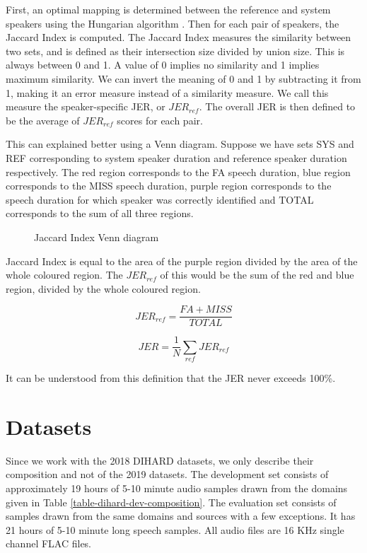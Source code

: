 	First, an optimal mapping is determined between the reference and system speakers using the Hungarian algorithm \cite{hungarian}. Then for each pair of speakers, the Jaccard Index \cite{hamers1989similarity} is computed. The Jaccard Index measures the similarity between two sets, and is defined as their intersection size divided by union size. This is always between 0 and 1. A value of 0 implies no similarity and 1 implies maximum similarity. We can invert the meaning of 0 and 1 by subtracting it from 1, making it an error measure instead of a similarity measure. We call this measure the speaker-specific JER, or $JER_{ref}$. The overall JER is then defined to be the average of $JER_{ref}$ scores for each pair.
	
	This can explained better using a Venn diagram. Suppose we have sets SYS and REF corresponding to system speaker duration and reference speaker duration respectively. The red region corresponds to the FA speech duration, blue region corresponds to the MISS speech duration, purple region corresponds to the speech duration for which speaker was correctly identified and TOTAL corresponds to the sum of all three regions.
	
	\begin{figure}[h]
		\centering
		\def\syscircle{(0,0) circle (1.5cm)}
		\def\refcircle{(0:2cm) circle (1.5cm)}
		\caption{Jaccard Index Venn diagram}
	\end{figure}
	
	Jaccard Index is equal to the area of the purple region divided by the area of the whole coloured region. The $JER_{ref}$ of this would be the sum of the red and blue region, divided by the whole coloured region.
	
	$$ JER_{ref} = \frac{FA + MISS}{TOTAL} $$
	
	$$ JER = \frac{1}{N}\sum_{ref}JER_{ref} $$
	
	It can be understood from this definition that the JER never exceeds 100\%.
	
\section{Datasets}
Since we work with the 2018 DIHARD datasets, we only describe their composition and not of the 2019 datasets. The development set consists of approximately 19 hours of 5-10 minute audio samples drawn from the domains given in Table \ref{table-dihard-dev-composition}. The evaluation set consists of samples drawn from the same domains and sources with a few exceptions. It has 21 hours of 5-10 minute long speech samples. All audio files are 16 KHz single channel FLAC files.

